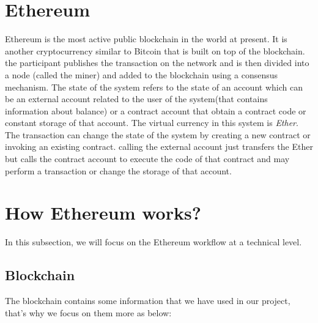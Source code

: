  \section{Ethereum}
 Ethereum is the most active public blockchain in the world at present. It is another cryptocurrency similar to Bitcoin that is built on top of the blockchain. the participant publishes the transaction on the network and is then divided into a node (called the miner) and added to the blockchain using a consensus mechanism. The state of the system refers to the state of an account which can be an external account related to the user of the system(that contains information about balance) or a contract account that obtain a contract code or constant storage of that account. The virtual currency in this system is \textit{Ether}. The transaction can change the state of the system by creating a new contract or invoking an existing contract. calling the external account just transfers the Ether but calls the contract account to execute the code of that contract and may perform a transaction or change the storage of that account\cite{Ilya}.

\section{How Ethereum works?}
In this subsection, we will focus on the Ethereum workflow at a technical level.
\subsection{Blockchain}
The blockchain contains some information that we have used in our project, that's why we focus on them more as below:


